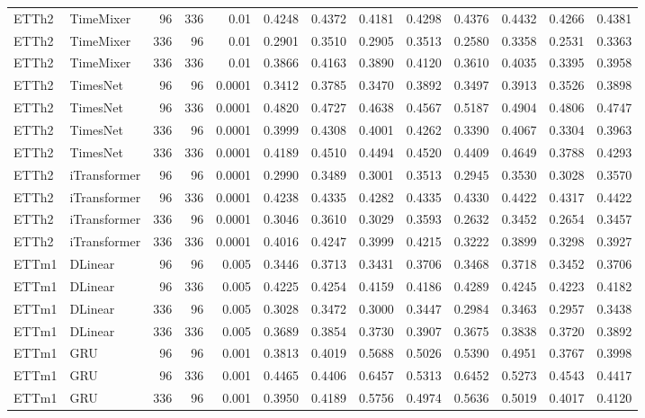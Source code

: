 \begin{longtable}{@{}llrrr*{8}{r}@{}}
ETTh2 & TimeMixer & 96 & 336 & 0.01 & 0.4248 & 0.4372 & 0.4181 & 0.4298 & 0.4376 & 0.4432 & 0.4266 & 0.4381 \\
ETTh2 & TimeMixer & 336 & 96 & 0.01 & 0.2901 & 0.3510 & 0.2905 & 0.3513 & 0.2580 & 0.3358 & 0.2531 & 0.3363 \\
ETTh2 & TimeMixer & 336 & 336 & 0.01 & 0.3866 & 0.4163 & 0.3890 & 0.4120 & 0.3610 & 0.4035 & 0.3395 & 0.3958 \\
ETTh2 & TimesNet & 96 & 96 & 0.0001 & 0.3412 & 0.3785 & 0.3470 & 0.3892 & 0.3497 & 0.3913 & 0.3526 & 0.3898 \\
ETTh2 & TimesNet & 96 & 336 & 0.0001 & 0.4820 & 0.4727 & 0.4638 & 0.4567 & 0.5187 & 0.4904 & 0.4806 & 0.4747 \\
ETTh2 & TimesNet & 336 & 96 & 0.0001 & 0.3999 & 0.4308 & 0.4001 & 0.4262 & 0.3390 & 0.4067 & 0.3304 & 0.3963 \\
ETTh2 & TimesNet & 336 & 336 & 0.0001 & 0.4189 & 0.4510 & 0.4494 & 0.4520 & 0.4409 & 0.4649 & 0.3788 & 0.4293 \\
ETTh2 & iTransformer & 96 & 96 & 0.0001 & 0.2990 & 0.3489 & 0.3001 & 0.3513 & 0.2945 & 0.3530 & 0.3028 & 0.3570 \\
ETTh2 & iTransformer & 96 & 336 & 0.0001 & 0.4238 & 0.4335 & 0.4282 & 0.4335 & 0.4330 & 0.4422 & 0.4317 & 0.4422 \\
ETTh2 & iTransformer & 336 & 96 & 0.0001 & 0.3046 & 0.3610 & 0.3029 & 0.3593 & 0.2632 & 0.3452 & 0.2654 & 0.3457 \\
ETTh2 & iTransformer & 336 & 336 & 0.0001 & 0.4016 & 0.4247 & 0.3999 & 0.4215 & 0.3222 & 0.3899 & 0.3298 & 0.3927 \\
ETTm1 & DLinear & 96 & 96 & 0.005 & 0.3446 & 0.3713 & 0.3431 & 0.3706 & 0.3468 & 0.3718 & 0.3452 & 0.3706 \\
ETTm1 & DLinear & 96 & 336 & 0.005 & 0.4225 & 0.4254 & 0.4159 & 0.4186 & 0.4289 & 0.4245 & 0.4223 & 0.4182 \\
ETTm1 & DLinear & 336 & 96 & 0.005 & 0.3028 & 0.3472 & 0.3000 & 0.3447 & 0.2984 & 0.3463 & 0.2957 & 0.3438 \\
ETTm1 & DLinear & 336 & 336 & 0.005 & 0.3689 & 0.3854 & 0.3730 & 0.3907 & 0.3675 & 0.3838 & 0.3720 & 0.3892 \\
ETTm1 & GRU & 96 & 96 & 0.001 & 0.3813 & 0.4019 & 0.5688 & 0.5026 & 0.5390 & 0.4951 & 0.3767 & 0.3998 \\
ETTm1 & GRU & 96 & 336 & 0.001 & 0.4465 & 0.4406 & 0.6457 & 0.5313 & 0.6452 & 0.5273 & 0.4543 & 0.4417 \\
ETTm1 & GRU & 336 & 96 & 0.001 & 0.3950 & 0.4189 & 0.5756 & 0.4974 & 0.5636 & 0.5019 & 0.4017 & 0.4120 \\

\end{longtable}
